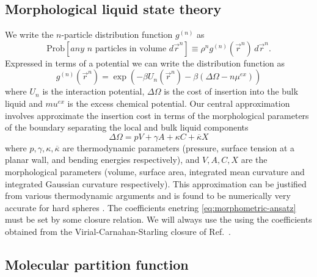 \documentclass[11pt,twoside]{report}
\begin{document}
\subsection{Morphological liquid state theory}

We write the $n$-particle distribution function $g^{(n)}$ as \cite{Hansen2013} \begin{equation}\label{eq:n-density-pdf}
  \textrm{Prob}\left[ \textit{any } n \textrm{ particles in volume } d\vec{r}^n \right]
  \equiv
  \rho^n g^{(n)}(\vec{r}^n) \, d\vec{r}^n.
\end{equation}
Expressed in terms of a potential we can write the distribution function as
\begin{equation}
  g^{(n)}(\vec{r}^n)
  =
  \exp{\left(-\beta U_n(\vec{r}^n) - \beta(\Delta\Omega - n\mu^{ex}) \right)}
\end{equation}
where $U_n$ is the interaction potential, $\Delta\Omega$ is the cost of insertion into the bulk liquid and $mu^{ex}$ is the excess chemical potential.
Our central approximation involves approximate the insertion cost in terms of the morphological parameters of the boundary separating the local and bulk liquid components
\begin{equation}
  \Delta\Omega = pV + \gamma A + \kappa C + \overline{\kappa} X
\end{equation}
where $p,\gamma,\kappa,\overline{\kappa}$ are thermodynamic parameters (pressure, surface tension at a planar wall, and bending energies respectively), and $V,A,C,X$ are the morphological parameters (volume, surface area, integrated mean curvature and integrated Gaussian curvature respectively).
This approximation can be justified from various thermodynamic arguments \cite{Konig2004,Robinson?,Robinson?,?} and is found to be numerically very accurate for hard spheres \cite{Hansen-Goos?,Roth2006,?,?}.
The coefficients enetring \eqref{eq:morphometric-ansatz} must be set by some closure relation.
We will always use the using the coefficients obtained from the Virial-Carnahan-Starling closure of Ref.\ \cite{Robinson?}.


\subsection{Molecular partition function}
\end{document}
